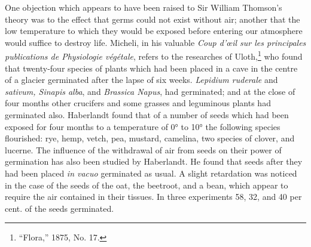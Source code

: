 \documentclass[a4paper, 11pt, oneside, english]{article}
\begin{document}
One objection which appears to have been raised to Sir William Thomson's theory was to the effect that germs could not exist without air; another that the low temperature to which they would be exposed before entering our atmosphere would suffice to destroy life. Micheli, in his valuable \emph{Coup d'œil sur les principales publications de Physiologie végétale}, refers to the researches of Uloth,\footnote{``Flora,'' 1875, No. 17.} who found that twenty-four species of plants which had been placed in a cave in the centre of a glacier germinated after the lapse of six weeks. \emph{Lepidium ruderale} and \emph{sativum, Sinapis alba}, and \emph{Brassica Napus}, had germinated; and at the close of four months other crucifers and some grasses and leguminous plants had germinated also. Haberlandt found that of a number of seeds which had been exposed for four months to a temperature of 0° to 10° the following species flourished: rye, hemp, vetch, pea, mustard, camelina, two species of clover, and lucerne. The influence of the withdrawal of air from seeds on their power of germination has also been studied by Haberlandt. He found that seeds after they had been placed \emph{in vacuo} germinated as usual. A slight retardation was noticed in the case of the seeds of the oat, the beetroot, and a bean, which appear to require the air contained in their tissues. In three experiments 58, 32, and 40 per cent. of the seeds germinated.
\clearpage
\end{document}
